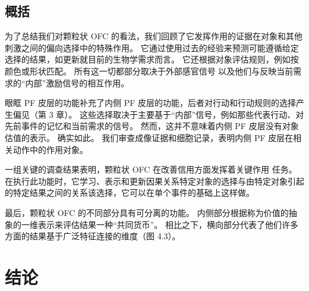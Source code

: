 \subsection{概括}
为了总结我们对颗粒状 OFC 的看法，我们回顾了它发挥作用的证据在对象和其他刺激之间的偏向选择中的特殊作用。 它通过使用过去的经验来预测可能遵循给定选择的结果，如更新就目前的生物学需求而言。 它还根据对象评估规则，例如按颜色或形状匹配。 所有这一切都部分取决于外部感官信号
以及他们与反映当前需求的“内部”激励信号的相互作用。\par
眼眶 PF 皮层的功能补充了内侧 PF 皮层的功能，后者对行动和行动规则的选择产生偏见（第 3 章）。 这些选择取决于主要基于“内部”信号，例如那些代表行动、对先前事件的记忆和当前需求的信号。 然而，这并不意味着内侧 PF 皮层没有对象估值的表示。 确实如此。 我们审查成像证据和细胞记录，表明内侧 PF 皮层在相关动作中的作用对象。\par
一组关键的调查结果表明，颗粒状 OFC 在改善信用方面发挥着关键作用
任务。 在执行此功能时，它学习、表示和更新因果关系特定对象的选择与由特定对象引起的特定结果之间的关系该选择，它可以在单个事件的基础上这样做。\par
最后，颗粒状 OFC 的不同部分具有可分离的功能。 内侧部分根据称为价值的抽象的一维表示来评估结果一种“共同货币”。 相比之下，横向部分代表了他们许多方面的结果基于广泛特征连接的维度（图 4.3）。\par
\section{结论}
